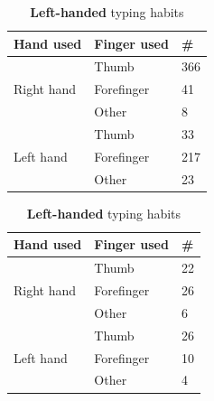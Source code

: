 {{    %
    \begin{table}[H]
      \parbox{.5\linewidth}{
        \centering
        \begin{tabular}{ l | l | l }
          \hline
          {\bf Hand used} & {\bf Finger used} & {\bf \#} \\ \hline
          \multirow{3}{*}{Right hand} & Thumb & 366 \\
          & Forefinger & 41 \\
          & Other & 8 \\ \hline
          \multirow{3}{*}{Left hand} & Thumb & 33 \\
          & Forefinger & 217 \\
          & Other & 23 \\ \hline
        \end{tabular}
        \caption{{\bf Right-handed} typing habits}
        \label{tab:righthandfinger}
      }
      \hfill
      \parbox{.5\linewidth}{
        \centering
        \begin{tabular}{ l | l | l }
          \hline
          {\bf Hand used} & {\bf Finger used} & {\bf \#} \\ \hline
          \multirow{3}{*}{Right hand} & Thumb & 22 \\ 
          & Forefinger & 26 \\
          & Other & 6 \\ \hline
          \multirow{3}{*}{Left hand} & Thumb & 26 \\ 
          & Forefinger & 10 \\
          & Other & 4 \\ \hline
        \end{tabular}
        \caption{{\bf Left-handed} typing habits}
        \label{tab:lefthandfinger}
      }
    \end{table}

    \begin{figure}[H]
      \centering


\end{figure}}}
